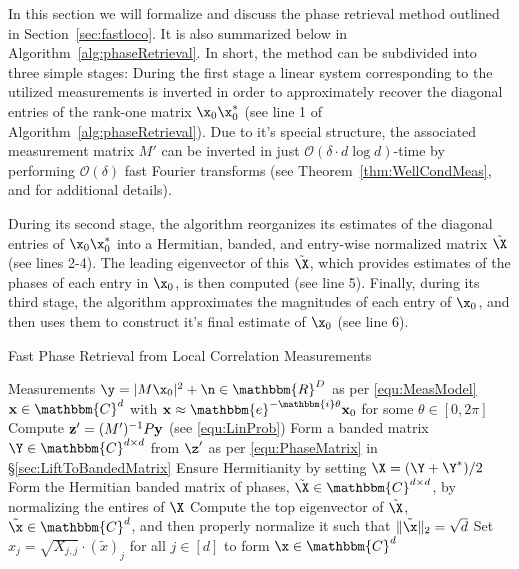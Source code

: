 
In this section we will formalize and discuss the phase retrieval method outlined in Section~\ref{sec:fastloco}.  It is also summarized below in Algorithm~\ref{alg:phaseRetrieval}.  In short, the method can be subdivided into three simple stages:  During the first stage a linear system corresponding to the utilized measurements is inverted in order to approximately recover the diagonal entries of the rank-one matrix $\x_0 \x^*_0$ (see line 1 of Algorithm~\ref{alg:phaseRetrieval}).  Due to it's special structure, the associated measurement matrix $M'$ can be inverted in just $\mathcal{O} \left( \delta \cdot d \log d \right)$-time by performing $\mathcal{O(\delta)}$ fast Fourier transforms (see Theorem~\ref{thm:WellCondMeas}, and \cite{IVW2015_FastPhase} for additional details).  

During its second stage, the algorithm reorganizes its estimates of the diagonal entries of $\x_0 \x^*_0$ into a Hermitian, banded, and entry-wise normalized matrix $\tilde{\X}$ (see lines 2-4).  The leading eigenvector of this $\tilde{\X}$, which provides estimates of the phases of each entry in $\x_0$, is then computed (see line 5).  Finally, during its third stage, the algorithm approximates the magnitudes of each entry of $\x_0$, and then uses them to construct it's final estimate of $\x_0$ (see line 6).

\begin{algorithm}
\renewcommand{\algorithmicrequire}{\textbf{Input:}}
\renewcommand{\algorithmicensure}{\textbf{Output:}}
\caption{Fast Phase Retrieval from Local Correlation Measurements}
\label{alg:phaseRetrieval}
\begin{algorithmic}[1]
    \REQUIRE Measurements $\y = |  M \x_0 |^2 + \n \in \mathbbm{R}^D$ as per \eqref{equ:MeasModel}
    \ENSURE ${\bf x} \in \mathbbm{C}^d$ with ${\bf x} \approx \mathbbm{e}^{-\mathbbm{i} \theta} {\bf x}_0$ for some $\theta \in [0, 2 \pi]$ 
    \STATE Compute ${\bf z}' = (M')^{-1} P {\bf y}$ (see \eqref{equ:LinProb}) %
    \STATE Form a banded matrix $\Y \in \mathbbm{C}^{d \times d}$ from $\z'$ as per \eqref{equ:PhaseMatrix} in \S\ref{sec:LiftToBandedMatrix}
    \STATE Ensure Hermitianity by setting $\X = (\Y + \Y^*) / 2$
    \STATE Form the Hermitian banded matrix of phases, $\tilde{\X} \in \mathbbm{C}^{d \times d}$, by normalizing the entires of $\X$ %
    \STATE Compute the top eigenvector of $\tilde{\X}$, $\tilde{\x} \in \mathbbm{C}^d$, and then properly normalize it such that $\| \tilde{\x} \|_2 = \sqrt{d}$
    \STATE Set $x_j = \sqrt{X_{j,j}} \cdot (\tilde{x})_j$ for all $j \in [d]$ to form $\x \in \mathbbm{C}^d$
    \end{algorithmic}
\end{algorithm}

